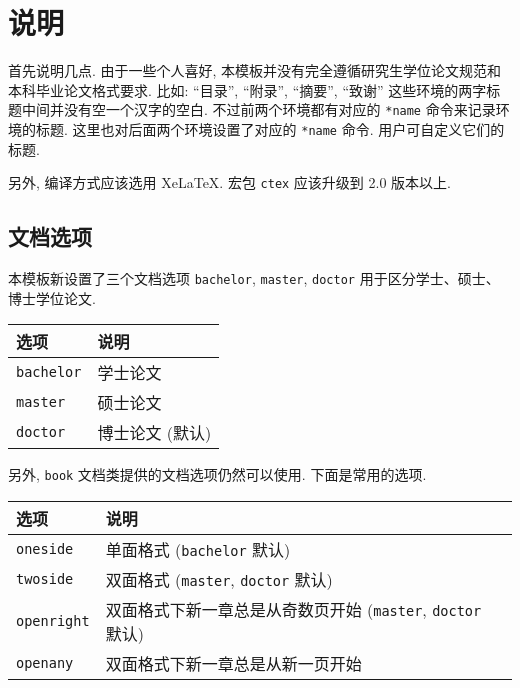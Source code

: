 ﻿\chapter{说明}

首先说明几点. 由于一些个人喜好, 本模板并没有完全遵循研究生学位论文规范和本科毕业论文格式要求. 比如: ``目录'', ``附录'', ``摘要'', ``致谢'' 这些环境的两字标题中间并没有空一个汉字的空白. 不过前两个环境都有对应的 \verb|*name| 命令来记录环境的标题. 这里也对后面两个环境设置了对应的 \verb|*name| 命令. 用户可自定义它们的标题.

另外, 编译方式应该选用 XeLaTeX. 宏包 \verb|ctex| 应该升级到 2.0 版本以上.

\section{文档选项}

本模板新设置了三个文档选项 \verb|bachelor|, \verb|master|, \verb|doctor| 用于区分学士、硕士、博士学位论文.

\begin{center}
  \begin{tabular}{ll}
    \toprule
    选项        & 说明\\
    \midrule
    \verb|bachelor|  & 学士论文\\
    \verb|master|    & 硕士论文\\
    \verb|doctor|    & 博士论文 (默认)\\
    \bottomrule
  \end{tabular}
\end{center}

另外, \verb|book| 文档类提供的文档选项仍然可以使用. 下面是常用的选项.

\begin{center}
  \begin{tabular}{lp{}l}
    \toprule
    选项        & 说明\\
    \midrule
    \verb|oneside|   & 单面格式 (\verb|bachelor| 默认)\\
    \verb|twoside|   & 双面格式 (\verb|master|, \verb|doctor| 默认)\\
    \midrule
    \verb|openright| & 双面格式下新一章总是从奇数页开始
                       (\verb|master|, \verb|doctor| 默认)\\
    \verb|openany|   & 双面格式下新一章总是从新一页开始\\
    \bottomrule
  \end{tabular}
\end{center}

